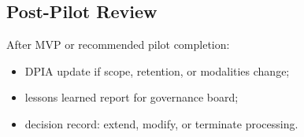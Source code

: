 \subsection{Post-Pilot Review}

After MVP or recommended pilot completion:
\begin{itemize}[noitemsep]
  \item DPIA update if scope, retention, or modalities change;
  \item lessons learned report for governance board;
  \item decision record: extend, modify, or terminate processing.
\end{itemize}
